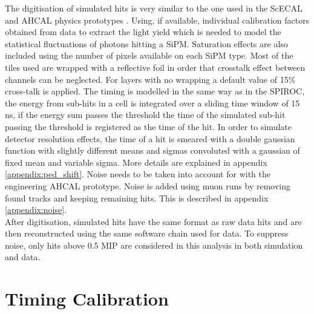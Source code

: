 \documentclass[twoside,a4paper,11pt]{article}
\begin{document}
The digitisation of simulated hits is very similar to the one used in the ScECAL and AHCAL physics prototypes \cite{CAN-002, CAN-010, JINST-6}. Using, if available, individual calibration factors obtained from data to extract the light yield which is needed to model the statistical fluctuations of photons hitting a SiPM. Saturation effects are also included using the number of pixels available on each SiPM type. Most of the tiles used are wrapped with a reflective foil in order that crosstalk effect between channels can be neglected. For layers with no wrapping a default value of 15\% cross-talk is applied. The timing is modelled in the same way as in the SPIROC, the energy from sub-hits in a cell is integrated over a sliding time window of 15 ns, if the energy sum passes the threshold the time of the simulated sub-hit passing the threshold is registered as the time of the hit. In order to simulate detector resolution effects, the time of a hit is smeared with a double gaussian function with slightly different means and sigmas convoluted with a gaussian of fixed mean and variable sigma. More details are explained in appendix \ref{appendix:ped_shift}. Noise needs to be taken into account for with the engineering AHCAL prototype. Noise is added using muon runs by removing found tracks and keeping remaining hits. This is described in appendix \ref{appendix:noise}.\\
After digitisation, simulated hits have the same format as raw data hits and are then reconstructed using the same software chain used for data. To suppress noise, only hits above 0.5 MIP are considered in this analysis in both simulation and data.

\section{Timing Calibration}
\end{document}
